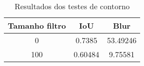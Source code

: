 \begin{table}[h]
            \centering
            \caption{Resultados dos testes de contorno}
            \label{tab:resultados-contorno}
            \begin{tabular}{|c|c|c|}
                \hline
                                Tamanho filtro & IoU & Blur \\
                \hline
                0 & 0.7385 & 53.49246\\
        100 & 0.60484 & 9.75581\\
                \hline
            \end{tabular}
        \end{table}


